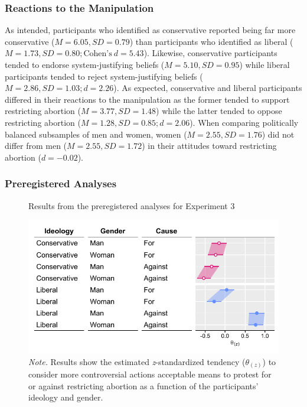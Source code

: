 \documentclass[12pt, letterpaper]{article}
\begin{document}
\hypertarget{reactions-to-the-manipulation-2}{%
\subsubsection{Reactions to the
Manipulation}\label{reactions-to-the-manipulation-2}}

As intended, participants who identified as conservative reported being
far more conservative (\(M = 6.05, SD = 0.79\)) than participants who
identified as liberal
(\(M = 1.73, SD = 0.80; \text{Cohen's}~d = 5.43\)). Likewise,
conservative participants tended to endorse system-justifying beliefs
(\(M = 5.10, SD = 0.95\)) while liberal participants tended to reject
system-justifying beliefs (\(M = 2.86, SD = 1.03; d = 2.26\)). As
expected, conservative and liberal participants differed in their
reactions to the manipulation as the former tended to support
restricting abortion (\(M = 3.77, SD = 1.48\)) while the latter tended
to oppose restricting abortion (\(M = 1.28, SD = 0.85; d = 2.06\)). When
comparing politically balanced subsamples of men and women, women
(\(M = 2.55, SD = 1.76\)) did not differ from men
(\(M = 2.55, SD = 1.72\)) in their attitudes toward restricting abortion
(\(d = -0.02\)).

\hypertarget{preregistered-analyses-2}{%
\subsubsection{Preregistered Analyses}\label{preregistered-analyses-2}}

\begin{figure}[!t]
\centering
\caption{Results from the preregistered analyses for Experiment 3}
\includegraphics[scale=1]{../Experiment 3/figures/figure-6}
\caption*{\textit{Note.} Results show the estimated \textit{z}-standardized tendency ($\theta_{(z)}$) to consider more controversial actions acceptable means to protest for or against restricting abortion as a function of the participants' ideology and gender.}
\label{fig:f6}
\end{figure}
\end{document}
